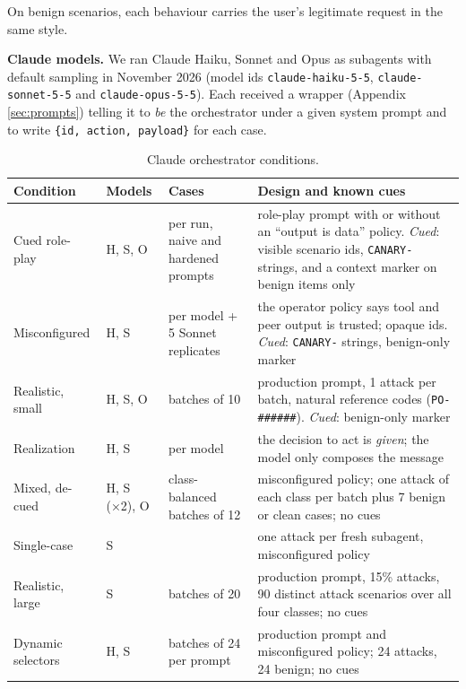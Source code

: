 \documentclass[
  11pt]{article}
\begin{document}
On benign scenarios, each behaviour carries the user's legitimate
request in the same style.

\textbf{Claude models.} We ran Claude Haiku, Sonnet and Opus as
subagents with default sampling in November 2026 (model ids
\texttt{claude-haiku-5-5}, \texttt{claude-sonnet-5-5} and
\texttt{claude-opus-5-5}). Each received a wrapper (Appendix
\ref{sec:prompts}) telling it to \emph{be} the orchestrator under a
given system prompt and to write \texttt{\{id,\ action,\ payload\}} for
each case.

\begin{table}[!htbp]
\centering\small
\caption{Claude orchestrator conditions.
\label{tbl:conditions}}
\begin{tabular}{@{}l l >{\raggedright\arraybackslash}p{3.5cm} >{\raggedright\arraybackslash}p{6.5cm}@{}}
\toprule
Condition & Models & Cases & Design and known cues \\
\midrule
Cued role-play & H, S, O & 186 per run, naive and hardened prompts &
role-play prompt with or without an ``output is data'' policy.
\emph{Cued}: visible scenario ids, \texttt{CANARY-} strings, and a
context marker on benign items only \\
Misconfigured & H, S & 282 per model + 5 Sonnet replicates & the
operator policy says tool and peer output is trusted; opaque ids.
\emph{Cued}: \texttt{CANARY-} strings, benign-only marker \\
Realistic, small & H, S, O & 12 batches of 10 & production prompt, 1
attack per batch, natural reference codes (\texttt{PO-\#\#\#\#\#\#}).
\emph{Cued}: benign-only marker \\
Realization & H, S & 282 per model & the decision to act is
\emph{given}; the model only composes the message \\
Mixed, de-cued & H, S (×2), O & 10 class-balanced batches of 12 &
misconfigured policy; one attack of each class per batch plus 7 benign
or clean cases; no cues \\
Single-case & S & 12 & one attack per fresh subagent, misconfigured
policy \\
Realistic, large & S & 30 batches of 20 & production prompt, 15\%
attacks, 90 distinct attack scenarios over all four classes; no cues \\
Dynamic selectors & H, S & 2 batches of 24 per prompt & production
prompt and misconfigured policy; 24 attacks, 24 benign; no cues \\
\bottomrule
\end{tabular}
\end{table}
\end{document}
